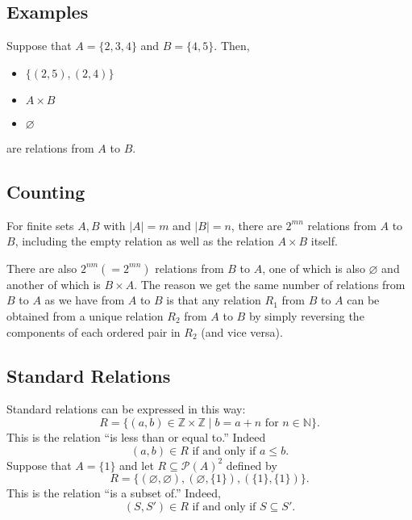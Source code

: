 \documentclass[11pt]{article}
\let\emptyset\varnothing
\begin{document}
    \subsection{Examples}
    Suppose that \(A = \{2,3,4\}\) and \(B = \{4,5\}\). Then,
    \begin{itemize}
        \item \(\{(2,5),(2,4)\}\)
        \item \(A \times B\)
        \item \(\emptyset\)
    \end{itemize}
    are relations from $A$ to $B$.

    \subsection{Counting}
    For finite sets $A,B$ with \(|A| = m\) and \(|B| = n\), there are \(2^{mn}\) relations from $A$ to $B$, including the empty relation as well as the relation \(A \times B\) itself.

    \vspace{1em}

    There are also \(2^{nm} (= 2^{mn})\) relations from $B$ to $A$, one of which is also \(\emptyset\) and another of which is \(B \times A\). The reason we get the same number of relations from $B$ to $A$ as we have from $A$ to $B$ is that any relation \(R_1\) from $B$ to $A$ can be obtained from a unique relation $R_2$ from $A$ to $B$ by simply reversing the components of each ordered pair in $R_2$ (and vice versa).

    \subsection{Standard Relations}
    Standard relations can be expressed in this way: \[R = \{(a,b) \in \mathbb{Z} \times \mathbb{Z} \mid b = a + n \text{ for } n \in \mathbb{N}\}.\] This is the relation ``is less than or equal to.'' Indeed \[(a,b) \in R \text{ if and only if } a \leq b.\] Suppose that \(A = \{1\}\) and let \(R \subseteq \mathcal{P}(A)^2\) defined by \[R = \{(\emptyset, \emptyset), (\emptyset, \{1\}), (\{1\}, \{1\})\}.\] This is the relation ``is a subset of.'' Indeed, \[(S,S') \in R \text{ if and only if } S \subseteq S'.\]
\end{document}
